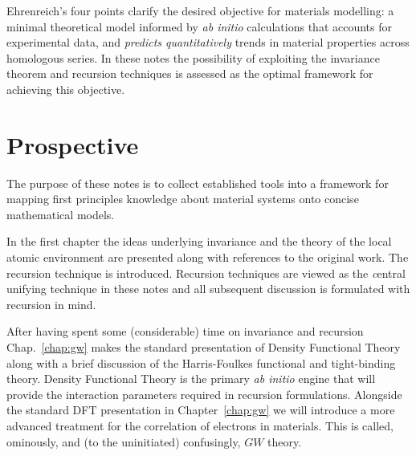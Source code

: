 
Ehrenreich's four points clarify the desired objective for materials modelling:
a minimal theoretical model informed by {\it ab initio} calculations that accounts for 
experimental data, and {\it predicts quantitatively} trends in material properties
across homologous series. In these notes the possibility of exploiting the invariance theorem 
and recursion techniques is assessed as the optimal framework
for achieving this objective. 

\section{Prospective}
The purpose of these notes is to collect established tools into 
a framework for mapping first principles knowledge about material systems 
onto concise mathematical models. 

In the first chapter the ideas underlying invariance and the 
theory of the local atomic environment are presented along with references
to the original work. The recursion technique is introduced. 
Recursion techniques are viewed as the {\emph central unifying technique} in these
notes and all subsequent discussion is formulated with recursion in mind.

After having spent some (considerable) time on invariance and recursion
Chap.~\ref{chap:gw} makes the standard presentation of Density Functional Theory along 
with a brief discussion of the Harris-Foulkes functional and tight-binding theory. 
Density Functional Theory is the primary {\it ab initio} engine that will 
provide the interaction parameters required in recursion formulations.
Alongside the standard DFT presentation in Chapter~\ref{chap:gw} we will
introduce a more advanced treatment for the correlation of electrons in materials.
This is called, ominously, and (to the uninitiated) confusingly, $GW$ theory.


